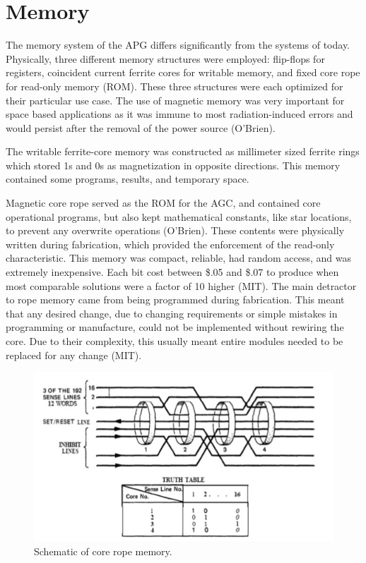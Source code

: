 \documentclass[a4paper,11pt]{article}
\begin{document}

\section{Memory}
The memory system of the APG differs significantly from the systems of today.  Physically, three different memory structures were employed: flip-flops for registers, coincident current ferrite cores for writable memory, and fixed core rope for read-only memory (ROM).  These three structures were each optimized for their particular use case.  The use of magnetic memory was very important for space based applications as it was immune to most radiation-induced errors and would persist after the removal of the power source (O'Brien).

The writable ferrite-core memory was constructed as millimeter sized ferrite rings which stored 1s and 0s as magnetization in opposite directions.  This memory contained some programs, results, and temporary space.  

Magnetic core rope served as the ROM for the AGC, and contained core operational programs, but also kept mathematical constants, like star locations, to prevent any overwrite operations (O'Brien).  These contents were physically written during fabrication, which provided the enforcement of the read-only characteristic.  This memory was compact, reliable, had random access, and was extremely inexpensive.  Each bit cost between \$.05 and \$.07 to produce when most comparable solutions were a factor of 10 higher (MIT). The main detractor to rope memory came from being programmed during fabrication.  This meant that any desired change, due to changing requirements or simple mistakes in programming or manufacture, could not be implemented without rewiring the core.  Due to their complexity, this usually meant entire modules needed to be replaced for any change (MIT).

\begin{figure}[h!]
\caption{Schematic of core rope memory.} 
\centering
\includegraphics[width=.8\textwidth]{core_rope.png} 
\end{figure}
\vspace{0.02cm}
\end{document}
